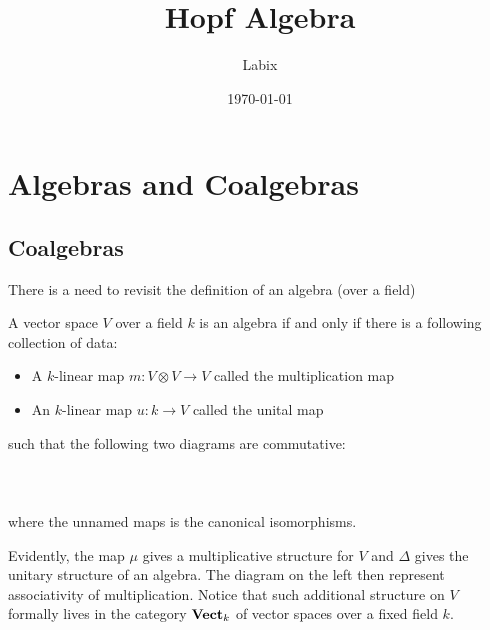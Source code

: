 \documentclass[a4paper]{article}
\title{Hopf Algebra}
\author{Labix}
\date{\today}
\begin{document}
\maketitle
\begin{abstract}
\end{abstract}
\pagebreak
\tableofcontents

\pagebreak
\section{Algebras and Coalgebras}
\subsection{Coalgebras}
There is a need to revisit the definition of an algebra (over a field)

\begin{prp}{}{} A vector space $V$ over a field $k$ is an algebra if and only if there is a following collection of data: 
\begin{itemize}
\item A $k$-linear map $m:V\otimes V\to V$ called the multiplication map
\item An $k$-linear map $u:k\to V$ called the unital map
\end{itemize}
such that the following two diagrams are commutative: \\~\\
\\~\\
where the unnamed maps is the canonical isomorphisms. 
\end{prp}

Evidently, the map $\mu$ gives a multiplicative structure for $V$ and $\Delta$ gives the unitary structure of an algebra. The diagram on the left then represent associativity of multiplication. Notice that such additional structure on $V$ formally lives in the category $\bold{Vect}_k$ of vector spaces over a fixed field $k$. \\~\\
\end{document}
